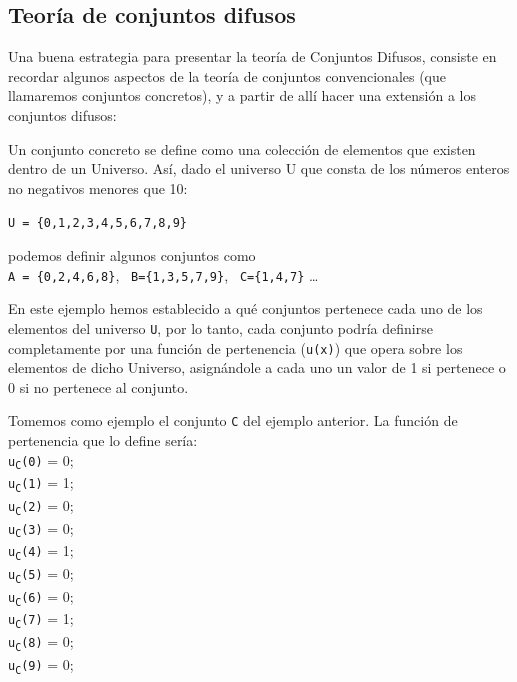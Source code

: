 \subsection{Teoría de conjuntos difusos}
Una buena estrategia para presentar la teoría de Conjuntos Difusos,
consiste en recordar algunos aspectos de la teoría de conjuntos
convencionales (que llamaremos conjuntos concretos), y a partir de allí
hacer una extensión a los conjuntos difusos:

Un conjunto concreto se define como una colección de elementos que
existen dentro de un Universo. Así, dado el universo U que consta de los números enteros no negativos menores que 10:

\texttt{U = \{0,1,2,3,4,5,6,7,8,9\}}

podemos definir algunos conjuntos como\\
\newline
\null\hspace{0.59cm}\texttt{A = \{0,2,4,6,8\}},\newline
\null\hspace{0.37cm}\texttt{ B=\{1,3,5,7,9\}},\newline
\null\hspace{0.37cm}\texttt{ C=\{1,4,7\}} \ldots

En este ejemplo hemos establecido a qué conjuntos pertenece cada uno de los elementos del universo \texttt{U}, por lo tanto, cada conjunto podría definirse completamente por una función de pertenencia (\texttt{u(x)}) que opera sobre los elementos de dicho Universo, asignándole a cada uno un valor de 1 si pertenece o 0 si no pertenece al conjunto.

Tomemos como ejemplo el conjunto \texttt{C} del ejemplo anterior.
La función de pertenencia que lo define sería:
\\ \newline
\null\hspace{0.59cm}\texttt{u\textsubscript{C}(0)} = 0;\\
\null\hspace{0.59cm}\texttt{u\textsubscript{C}(1)} = 1;\\
\null\hspace{0.59cm}\texttt{u\textsubscript{C}(2)} = 0;\\
\null\hspace{0.59cm}\texttt{u\textsubscript{C}(3)} = 0;\\
\null\hspace{0.59cm}\texttt{u\textsubscript{C}(4)} = 1;\\
\null\hspace{0.59cm}\texttt{u\textsubscript{C}(5)} = 0;\\
\null\hspace{0.59cm}\texttt{u\textsubscript{C}(6)} = 0;\\
\null\hspace{0.59cm}\texttt{u\textsubscript{C}(7)} = 1;\\
\null\hspace{0.59cm}\texttt{u\textsubscript{C}(8)} = 0;\\
\null\hspace{0.59cm}\texttt{u\textsubscript{C}(9)} = 0;

